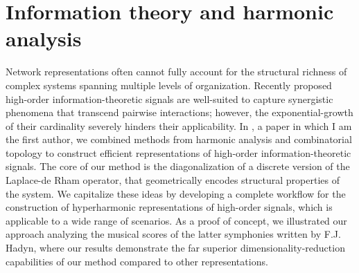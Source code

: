 \section{Information theory and harmonic analysis}

Network representations often cannot fully account for the structural richness of complex systems spanning multiple levels of organization.
Recently proposed high-order information-theoretic signals are well-suited to capture synergistic phenomena that transcend pairwise interactions; however, the exponential-growth of their cardinality severely hinders their applicability.
In \cite{medina2021hyperharmonic}, a paper in which I am the first author, we combined methods from harmonic analysis and combinatorial topology to construct efficient representations of high-order information-theoretic signals.
The core of our method is the diagonalization of a discrete version of the Laplace-de Rham operator, that geometrically encodes structural properties of the system.
We capitalize these ideas by developing a complete workflow for the construction of hyperharmonic representations of high-order signals, which is applicable to a wide range of scenarios.
As a proof of concept, we illustrated our approach  analyzing the musical scores of the latter symphonies written by F.J. Hadyn, where our results demonstrate the far superior dimensionality-reduction capabilities of our method compared to other representations.